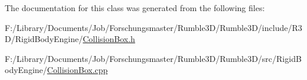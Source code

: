The documentation for this class was generated from the following files\+:\begin{DoxyCompactItemize}
\item 
F\+:/\+Library/\+Documents/\+Job/\+Forschungsmaster/\+Rumble3\+D/\+Rumble3\+D/include/\+R3\+D/\+Rigid\+Body\+Engine/\hyperlink{_collision_box_8h}{Collision\+Box.\+h}\item 
F\+:/\+Library/\+Documents/\+Job/\+Forschungsmaster/\+Rumble3\+D/\+Rumble3\+D/src/\+Rigid\+Body\+Engine/\hyperlink{_collision_box_8cpp}{Collision\+Box.\+cpp}\end{DoxyCompactItemize}
